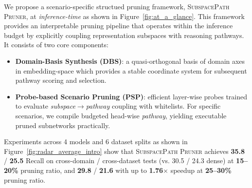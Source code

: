 We propose a scenario-specific structued pruning framework, \textsc{SubspacePath Pruner}, at \emph{inference-time} as shown in Figure~\ref{fig:at_a_glance}. 
This framework provides an interpretable pruning pipeline that operates within the inference budget by explicitly coupling representation subspaces with reasoning pathways. It consists of two core components:
\begin{itemize}[parsep=0pt]
    \vspace{-2pt}
    \item \textbf{Domain-Basis Synthesis (DBS)}:  a quasi-orthogonal basis of domain axes in embedding-space which provides a stable coordinate system for subsequent pathway scoring and selection.
    \item \textbf{Probe-based Scenario Pruning (PSP)}:  efficient layer-wise probes \cite{alain2016linearprobes} trained to evaluate \emph{subspace$\rightarrow$pathway} coupling with whitelists. For specific scenarios, we compile budgeted head-wise \emph{pathway}, yielding executable pruned subnetworks practically.
\end{itemize}
\vspace{-0.5mm}
 
Experiments across 4 models and 6 dataset splits as shown in Figure~\ref{fig:radar_average_intro} show that \textsc{SubspacePath Pruner} achieves \textbf{35.8} / \textbf{25.5} Recall on cross-domain / cross-dataset tests (vs. 30.5 / 24.3 dense) at \textbf{15--20\%} pruning ratio, and \textbf{29.8} / \textbf{21.6} with up to \textbf{1.76$\times$} speedup at \textbf{25--30\%} pruning ratio.
\vspace{-0.5mm}
